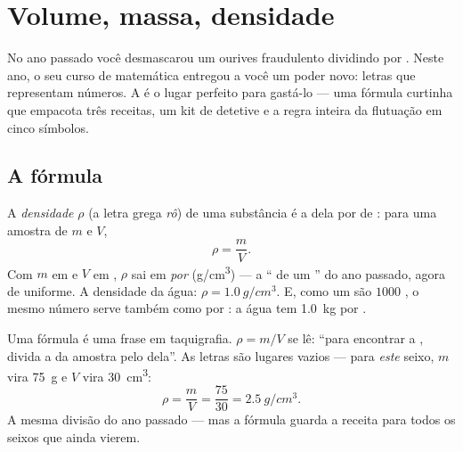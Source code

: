 \chapter{Volume, massa, densidade}\label{ch:g7:volume-mass-density}

No ano passado você desmascarou um ourives fraudulento dividindo
 por . Neste ano, o seu curso de matemática
entregou a você um poder novo: letras que representam números. A
 é o lugar perfeito para gastá-lo --- uma fórmula curtinha
que empacota três receitas, um kit de detetive e a regra inteira da
flutuação em cinco símbolos.

\section{A fórmula}

\begin{definition}\label{def:g7:volume-mass-density:formula}
A \emph{densidade} $\rho$ (a letra grega
\emph{rô}) de uma substância é a  dela por  de :
para uma amostra de  $m$ e  $V$,
\[
\rho = \frac{m}{V}.
\]
Com $m$ em  e $V$ em , $\rho$ sai em
\emph{ por } (\unit{g/cm^3}) --- a `` de
um '' do ano passado, agora de uniforme. A densidade
da água: $\rho = \qty{1.0}{g/cm^3}$. E, como um  são $1000$
, o mesmo número serve também como  por
: a água tem \qty{1.0}{kg} por .
\end{definition}

\begin{example}\label{ex:g7:volume-mass-density:reading}
Uma fórmula é uma frase em taquigrafia. $\rho = m/V$ se lê: ``para
encontrar a , divida a  da amostra pelo  dela''.
As letras são lugares vazios --- para \emph{este} seixo, $m$ vira
\qty{75}{g} e $V$ vira \qty{30}{cm^3}:
\[
\rho = \frac{m}{V} = \frac{75}{30} = \qty{2.5}{g/cm^3}.
\]
A mesma divisão do ano passado --- mas a fórmula guarda a receita
para todos os seixos que ainda vierem.
\end{example}

